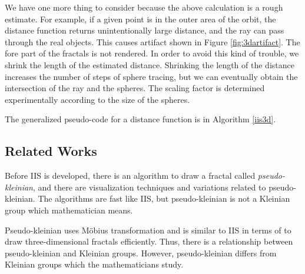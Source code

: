 We have one more thing to consider because the above calculation is
a rough estimate.
For example, if a given point is in the outer area of the orbit, the
distance function returns unintentionally large distance, and the ray
can pass through the real objects. This causes artifact shown in Figure
\ref{fig:3dartifact}. The fore part of the fractals is not rendered.
In order to avoid this kind of trouble, we shrink the length of
the estimated distance.
Shrinking the length of the distance increases the number of steps of
sphere tracing, but we can
eventually obtain the intersection of the ray and the spheres.
The scaling factor is determined experimentally according to the size of
the spheres.

The generalized pseudo-code for a distance function is in Algorithm \ref{iis3d}. 

\subsection{Related Works}

Before IIS is developed, there is an algorithm to draw a fractal called
\textit{pseudo-kleinian}, and there are visualization techniques and
variations related to pseudo-kleinian.
The algorithms are fast like IIS, but pseudo-kleinian is not a Kleinian
group which mathematician means.

Pseudo-kleinian uses M\"obius transformation and is similar to IIS in
terms of to draw three-dimensional fractals efficiently.
Thus, there is a relationship between pseudo-kleinian and Kleinian groups.
However, pseudo-kleinian differs from Kleinian groups which the
mathematicians study.

